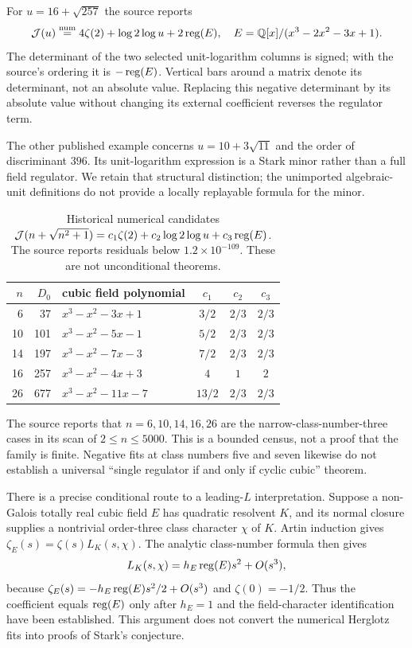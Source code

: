 For $u=16+\sqrt{257}$ the source reports
\begin{equation}\label{stark:eq:257}
\mathcal J(u)\overset{\rm num}=4\zeta(2)+\log2\log u+2\operatorname{reg}(E),
\quad E=\mathbb Q[x]/(x^3-2x^2-3x+1).
\end{equation}
The determinant of the two selected unit-logarithm columns is signed;
with the source's ordering it is $-\operatorname{reg}(E)$.
Vertical bars around a matrix denote its determinant, not an absolute
value. Replacing this negative determinant by its absolute value without
changing its external coefficient reverses the regulator term.

The other published example concerns $u=10+3\sqrt{11}$ and the order of
discriminant $396$. Its unit-logarithm expression is a Stark minor rather
than a full field regulator. We retain that structural distinction; the
unimported algebraic-unit definitions do not provide a locally replayable
formula for the minor.

\begin{table}[ht]\centering\small
\begin{tabular}{rrlccc}
\toprule
$n$&$D_0$&cubic field polynomial&$c_1$&$c_2$&$c_3$\\
\midrule
6&37&$x^3-x^2-3x+1$&$3/2$&$2/3$&$2/3$\\
10&101&$x^3-x^2-5x-1$&$5/2$&$2/3$&$2/3$\\
14&197&$x^3-x^2-7x-3$&$7/2$&$2/3$&$2/3$\\
16&257&$x^3-x^2-4x+3$&$4$&$1$&$2$\\
26&677&$x^3-x^2-11x-7$&$13/2$&$2/3$&$2/3$\\
\bottomrule
\end{tabular}
\caption{Historical numerical candidates
$\mathcal J(n+\sqrt{n^2+1})=c_1\zeta(2)+c_2\log2\log u+c_3\operatorname{reg}(E)$.
The source reports residuals below $1.2\times10^{-109}$. These are not
unconditional theorems.}\label{stark:tab:family}
\end{table}
The source reports that $n=6,10,14,16,26$ are the narrow-class-number-three
cases in its scan of $2\le n\le5000$. This is a bounded census, not a proof
that the family is finite. Negative fits at class numbers five and seven
likewise do not establish a universal ``single regulator if and only if
cyclic cubic'' theorem.

There is a precise conditional route to a leading-$L$ interpretation.
Suppose a non-Galois totally real cubic field $E$ has quadratic resolvent
$K$, and its normal closure supplies a nontrivial order-three class
character $\chi$ of $K$. Artin induction gives
$\zeta_E(s)=\zeta(s)L_K(s,\chi)$.
The analytic class-number formula then gives
\[
L_K(s,\chi)=h_E\operatorname{reg}(E)s^2+O(s^3),
\]
because $\zeta_E(s)=-h_E\operatorname{reg}(E)s^2/2+O(s^3)$ and $\zeta(0)=-1/2$.
Thus the coefficient equals $\operatorname{reg}(E)$ only after $h_E=1$ and the
field-character identification have been established. This argument does
not convert the numerical Herglotz fits into proofs of Stark's conjecture.

